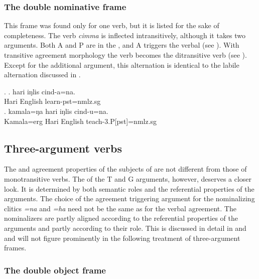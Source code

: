 \subsubsection{The double nominative frame}\label{itr-teach}


\noindent
This frame was found only for one verb, but it is listed for the sake of completeness. The verb \emph{cimma}  is inflected intransitively, although it takes two arguments. Both A and P are in the , and  A triggers the verbal  (see  \Next[a]). With transitive agreement morphology the verb becomes the ditransitive verb  (see \Next[b]). Except for the additional argument, this alternation is identical to the labile alternation discussed in . 

\ex. \ag. hari iŋlis cind-a=na.\\
		Hari English learn{\sc [3sg]-pst=nmlz.sg}	\\
 	\bg. kamala=ŋa hari iŋlis cind-u=na.\\
	Kamala{\sc =erg} Hari English teach{\sc -3.P[pst]=nmlz.sg}		\\

\subsection{Three-argument verbs}\label{three-arg-frame}

The  and agreement properties of the subjects of  are not different from those of monotransitive verbs. The  of the T and G arguments, however, deserves a closer look. It is determined  by both semantic roles and the referential properties of the arguments.  The choice of the agreement triggering argument for the nominalizing clitics \emph{=na} and \emph{=ha} need not be the same as for the verbal agreement. The nominalizers are partly aligned according to the referential properties of the arguments and partly according to their role. This is discussed in detail in  and  and will not figure prominently in the following treatment of three-argument frames.
 
\subsubsection{The double object frame}

